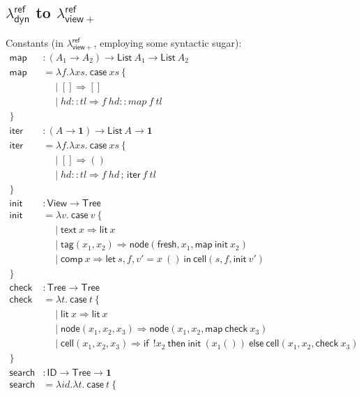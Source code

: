 \documentclass{article}
\newcommand{\mf}[1]{\mathsf{#1}}
\newcommand{\mb}[1]{\mathbf{#1}}
\newcommand{\semi}{\,;\,}
\newcommand{\tone}{\mb{1}}
\newcommand{\tview}{\mf{View}}
\newcommand{\ttree}{\mf{Tree}}
\newcommand{\vtxt}[1]{\mf{text}\ #1}
\newcommand{\vtag}[2]{\mf{tag}(#1, #2)}
\newcommand{\elet}[3]{\mf{let}\ #1 = #2\ \mf{in}\ #3}
\newcommand{\eif}[3]{\mf{if}\ #1\ \mf{then}\ #2\ \mf{else}\ #3}
\newcommand{\eget}[1]{\ !#1}
\newcommand{\elit}[1]{\mf{lit}\ #1}
\begin{document}
\subsection{$\lambda^\mf{ref}_\mf{dyn}$ to $\lambda^\mf{ref}_{\mf{view}+}$}

Constants (in $\lambda^\mf{ref}_{\mf{view}+}$,
employing some syntactic sugar):
\begin{align*}
\mf{map} &: (A_1 \rightarrow A_2) \rightarrow \mf{List}\ A_1 
\rightarrow \mf{List}\ A_2\\
\mf{map} &= \lambda f.\lambda xs.\ \mf{case}\ xs\ \{\\
&\quad\mid [] \Rightarrow []\\
&\quad\mid hd :: tl \Rightarrow f\ hd :: map\ f\ tl\\
\}\\
\mf{iter} &: (A \rightarrow \tone) \rightarrow \mf{List}\ A \rightarrow \tone\\
\mf{iter} &= \lambda f.\lambda xs.\ \mf{case}\ xs\ \{\\
&\quad\mid [] \Rightarrow ()\\
&\quad\mid hd :: tl \Rightarrow f\ hd \semi \mf{iter}\ f\ tl\\
\}\\
\mf{init} &: \tview \rightarrow \ttree\\
\mf{init} &= \lambda v.\ \mf{case}\ v\ \{\\
&\quad\mid \vtxt{x} \Rightarrow \elit{x}\\
&\quad\mid \vtag{x_1}{x_2} \Rightarrow 
  \mf{node}(\mf{fresh}, x_1, \mf{map}\ \mf{init}\ x_2)\\
&\quad\mid \mf{comp}\ x \Rightarrow \elet{s,f,v'}{x\ ()}{
  \mf{cell}(s,f,\mf{init}\ v')\\
}\}\\
\mf{check} &: \ttree \rightarrow \ttree\\
\mf{check} &= \lambda t.\ \mf{case}\ t\ \{\\
&\quad\mid \elit{x} \Rightarrow \elit{x}\\
&\quad\mid \mf{node}(x_1, x_2, x_3) \Rightarrow 
  \mf{node}(x_1, x_2, \mf{map}\ \mf{check}\ x_3)\\
&\quad\mid \mf{cell}(x_1, x_2, x_3) \Rightarrow 
  \eif{\eget{x_2}}{
    \mf{init}\ (x_1 ())
  } {
    \mf{cell}(x_1, x_2, \mf{check}\ x_3)
  }\\
\}\\
\mf{search} &: \mf{ID} \rightarrow \mf{Tree} \rightarrow \tone\\
\mf{search} &= \lambda id.\lambda t.\ \mf{case}\ t\ \{\\

\end{align*}
\end{document}
